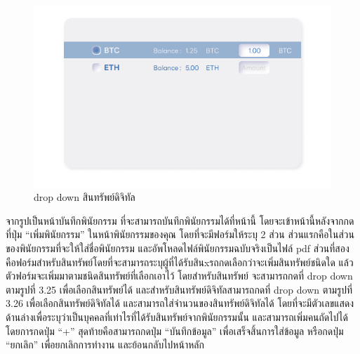 \documentclass[12pt,oneside,openright,a4paper]{cpe-thai-project}
\begin{document}
		\FloatBarrier
		\begin{figure}[!thb]
			\centering
			\includegraphics[scale=0.25]{dropdown3}
			\caption{drop down สินทรัพย์ดิจิทัล}
		\end{figure}
		\FloatBarrier
		\tab จากรูปเป็นหน้าบันทึกพินัยกรรม ที่จะสามารถบันทึกพินัยกรรมได้ที่หน้านี้ โดยจะเข้าหน้านี้หลังจากกดที่ปุ่ม “เพิ่มพินัยกรรม” ในหน้าพินัยกรรมของคุณ โดยที่จะมีฟอร์มให้ระบุ 2 ส่วน ส่วนแรกคือในส่วนของพินัยกรรมที่จะให้ใส่ชื่อพินัยกรรม และอัพโหลดไฟล์พินัยกรรมฉบับจริงเป็นไฟล์ pdf ส่วนที่สองคือฟอร์มสำหรับสินทรัพย์โดยที่จะสามารถระบุผู้ที่ได้รับสินxรถกดเลือกว่าจะเพิ่มสินทรัพย์ชนิดใด แล้วตัวฟอร์มจะเพิ่มมาตามชนิดสินทรัพย์ที่เลือกเอาไว้ โดยสำหรับสินทรัพย์ จะสามารถกดที่ drop down ตามรูปที่ 3.25 เพื่อเลือกสินทรัพย์ได้ และสำหรับสินทรัพย์ดิจิทัลสามารถกดที่ drop down ตามรูปที่ 3.26 เพื่อเลือกสินทรัพย์ดิจิทัลได้ และสามารถใส่จำนวนของสินทรัพย์ดิจิทัลได้  โดยที่จะมีตัวเลขแสดงด้านล่างเพื่อระบุว่าเป็นบุคคลที่เท่าไรที่ได้รับสินทรัพย์จากพินัยกรรมนั้น และสามารถเพิ่มคนถัดไปได้ โดยการกดปุ่ม “+” สุดท้ายคือสามารถกดปุ่ม “บันทึกข้อมูล” เพื่อเสร็จสิ้นการใส่ข้อมูล หรือกดปุ่ม “ยกเลิก” เพื่อยกเลิกการทำงาน และย้อนกลับไปหน้าหลัก
\clearpage
\end{document}
